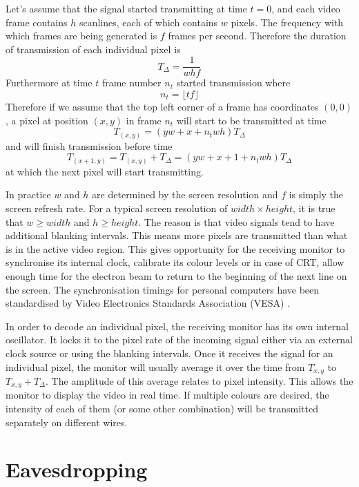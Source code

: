 \documentclass[a4paper,12pt,twoside,openright]{report}
\begin{document}
Let's assume that the signal started transmitting at time $t=0$, and each video frame contains $h$ scanlines, each of which contains $w$ pixels. The frequency with which frames are being generated is $f$ frames per second. Therefore the duration of transmission of each individual pixel is $$T_{\Delta}=\frac{1}{w h f}$$ Furthermore at time $t$ frame number $n_{t}$ started transmission where $$n_{t}=\lfloor t f \rfloor$$ Therefore if we assume that the top left corner of a frame has coordinates $(0, 0)$, a pixel at position $(x, y)$ in frame $n_{t}$ will start to be transmitted at time $$T_{(x,y)}= (y w + x + n_{t} w h) T_{\Delta} $$ and will finish transmission before time $$T_{(x+1,y)} = T_{(x,y)} + T_{\Delta} =(y w + x + 1 + n_{t} w h) T_{\Delta} $$ at which the next pixel will start transmitting.

In practice $w$ and $h$ are determined by the screen resolution and $f$ is simply the screen refresh rate. For a typical screen resolution of $width \times height$, it is true that $w \geq width$ and $h \geq height$. The reason is that video signals tend to have additional blanking intervals. This means more pixels are transmitted than what is in the active video region. This gives opportunity for the receiving monitor to synchronise its internal clock, calibrate its colour levels or in case of CRT, allow enough time for the electron beam to return to the beginning of the next line on the screen. The synchronisation timings for personal computers have been standardised by Video Electronics Standards Association (VESA) \cite{vesa}.

In order to decode an individual pixel, the receiving monitor has its own internal oscillator. It locks it to the pixel rate of the incoming signal either via an external clock source or using the blanking intervals. Once it receives the signal for an individual pixel, the monitor will usually average it over the time from $T_{x,y}$ to $T_{x,y}+T_{\Delta}$. The amplitude of this average relates to pixel intensity. This allows the monitor to display the video in real time. If multiple colours are desired, the intensity of each of them (or some other combination) will be transmitted separately on different wires.

\section{Eavesdropping}
\end{document}
